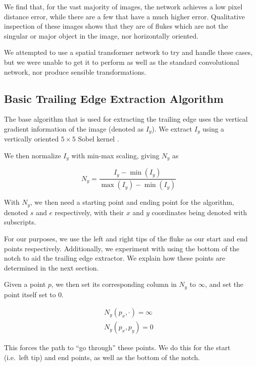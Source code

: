 We find that, for the vast majority of images, the network achieves a low pixel distance error, while there are a few that have a much higher error.
Qualitative inspection of these images shows that they are of flukes which are not the singular or major object in the image, nor horizontally oriented.


We attempted to use a spatial transformer network \cite{jaderberg2015spatial} to try and handle these cases, but we were unable to get it to perform as well as the standard convolutional network, nor produce sensible transformations.

\subsection{Basic Trailing Edge Extraction Algorithm}


The base algorithm that is used for extracting the trailing edge uses the vertical gradient information of the image (denoted as $I_y$).
We extract $I_y$ using a vertically oriented $5 \times 5$ Sobel kernel \cite{Sobel1968}.  

We then normalize $I_y$ with min-max scaling, giving $N_y$ as

\begin{equation} \label{eqn:norm01}
N_{y} = \frac{I_y - \min(I_y)}{\max(I_y) - \min(I_y)}
\end{equation}

With $N_y$, we then need a starting point and ending point for the algorithm, denoted $s$ and $e$ respectively, with their $x$ and $y$ coordinates being denoted with subscripts. 

For our purposes, we use the left and right tips of the fluke as our start and end points respectively.
Additionally, we experiment with using the bottom of the notch to aid the trailing edge extractor.
We explain how these points are determined in the next section.

Given a point $p$, we then set its corresponding column in $N_y$ to $\infty$, and set the point itself set to $0$. 

\begin{align} \label{eqn:te_setup}
N_y(p_x,\cdot) = \infty \\
N_y(p_x,p_y) = 0
\end{align}

This forces the path to ``go through'' these points. 
We do this for the start (i.e.\ left tip) and end points, as well as the bottom of the notch. 

